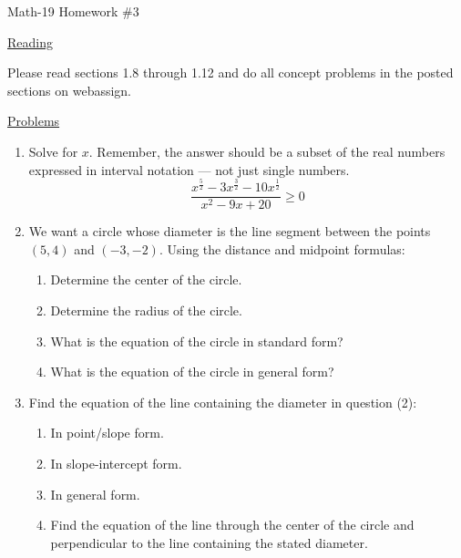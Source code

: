 \documentclass[letterpaper,12pt,fleqn]{article}
\begin{document}
\begin{center}
\Large Math-19 Homework \#3
\end{center}

\vspace{0.5in}

\underline{Reading}

Please read sections 1.8 through 1.12 and do all concept problems in the posted
sections on web\-assign.

\underline{Problems}

\begin{enumerate}
\item Solve for $x$.  Remember, the answer should be a subset of the real
numbers expressed in interval notation --- not just single numbers.
\[\frac{x^{\frac{5}{2}}-3x^{\frac{3}{2}}-10x^{\frac{1}{2}}}{x^2-9x+20}\ge0\]

\item We want a circle whose diameter is the line segment between the points
$(5,4)$ and $(-3,-2)$. Using the distance and midpoint formulas:
\begin{enumerate}
\item{Determine the center of the circle.}
\item{Determine the radius of the circle.}
\item{What is the equation of the circle in standard form?}
\item{What is the equation of the circle in general form?}
\end{enumerate}

\item Find the equation of the line containing the diameter in question (2):
\begin{enumerate}
\item{In point/slope form.}
\item{In slope-intercept form.}
\item{In general form.}
\item{Find the equation of the line through the center of the circle and
perpendicular to the line containing the stated diameter.}
\end{enumerate}


\end{enumerate}
\end{document}
